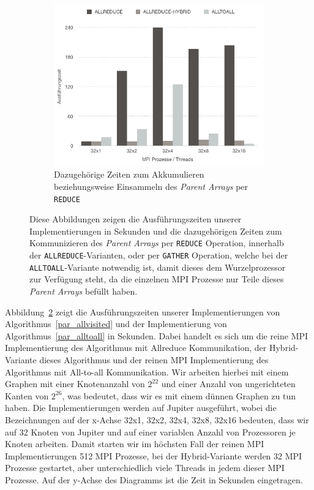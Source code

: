 \documentclass[11pt,a4paper]{article}
\begin{document}
\begin{figure}[h]
\begin{subfigure}[b]{0.48\textwidth}
        \includegraphics[width=1\textwidth]{reducing_parent}
        \caption{Dazugehörige Zeiten zum Akkumulieren beziehungsweise Einsammeln des \textit{Parent Arrays} per \lstinline{REDUCE}}
        \label{fig:reducing1}
    \end{subfigure}
    \caption{Diese Abbildungen zeigen die Ausführungszeiten unserer Implementierungen in Sekunden und die dazugehörigen Zeiten zum Kommunizieren des \textit{Parent Arrays} per \lstinline{REDUCE} Operation, innerhalb der \lstinline{ALLREDUCE}-Varianten, oder per \lstinline{GATHER} Operation, welche bei der \lstinline{ALLTOALL}-Variante notwendig ist, damit dieses dem Wurzelprozessor zur Verfügung steht, da die einzelnen MPI Prozesse nur Teile dieses \textit{Parent Arrays} befüllt haben.}
\label{fig:analyse1}
\end{figure}
Abbildung~\ref{fig:analyse1} zeigt die Ausführungszeiten unserer Implementierungen von Algorithmus~\ref{par_allvisited} und der Implementierung von Algorithmus~\ref{par_alltoall} in Sekunden. Dabei handelt es sich um die reine MPI Implementierung des Algorithmus mit Allreduce Kommunikation, der Hybrid-Variante dieses Algorithmus und der reinen MPI Implementierung des Algorithmus mit All-to-all Kommunikation. Wir arbeiten hierbei mit einem Graphen mit einer Knotenanzahl von \(2^{22}\) und einer Anzahl von ungerichteten Kanten von \(2^{26}\), was bedeutet, dass wir es mit einem dünnen Graphen zu tun haben. Die Implementierungen werden auf Jupiter ausgeführt, wobei die Bezeichnungen auf der x-Achse 32x1, 32x2, 32x4, 32x8, 32x16 bedeuten, dass wir auf 32 Knoten von Jupiter und auf einer variablen Anzahl von Prozessoren je Knoten arbeiten. Damit starten wir im höchsten Fall der reinen MPI Implementierungen 512 MPI Prozesse, bei der Hybrid-Variante werden 32 MPI Prozesse gestartet, aber unterschiedlich viele Threads in jedem dieser MPI Prozesse. Auf der y-Achse des Diagramms ist die Zeit in Sekunden eingetragen.\\
\end{document}
